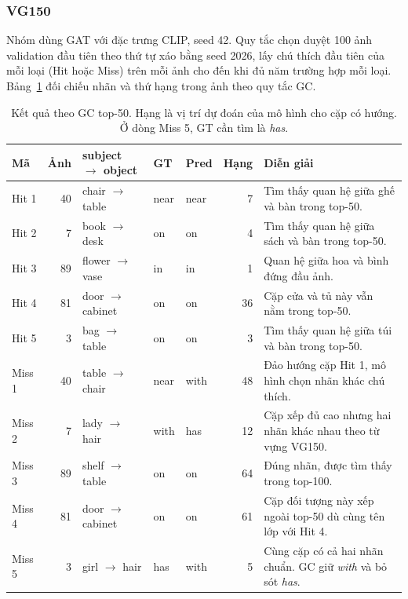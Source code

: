 \subsubsection{VG150}\label{app:vgcases}
Nhóm dùng GAT với đặc trưng CLIP, seed 42. Quy tắc chọn duyệt 100 ảnh validation
đầu tiên theo thứ tự xáo bằng seed 2026, lấy chú thích đầu tiên của mỗi loại
(Hit hoặc Miss) trên mỗi ảnh cho đến khi đủ năm trường hợp mỗi loại.
Bảng~\ref{tab:vgcases} đối chiếu nhãn và thứ hạng trong ảnh theo quy tắc GC.

\begin{table}[H]
\centering\small
\caption{Kết quả theo GC top-50. Hạng là vị trí dự đoán của mô hình cho cặp có hướng.
Ở dòng Miss 5, GT cần tìm là \textit{has}.}\label{tab:vgcases}
\begin{tabularx}{\linewidth}{@{}lrl llr X@{}}\toprule
Mã & Ảnh & subject $\to$ object & GT & Pred & Hạng & Diễn giải\\\midrule
Hit 1 & 40 & chair $\to$ table & near & near & 7 & Tìm thấy quan hệ giữa ghế và bàn trong top-50.\\
Hit 2 & 7 & book $\to$ desk & on & on & 4 & Tìm thấy quan hệ giữa sách và bàn trong top-50.\\
Hit 3 & 89 & flower $\to$ vase & in & in & 1 & Quan hệ giữa hoa và bình đứng đầu ảnh.\\
Hit 4 & 81 & door $\to$ cabinet & on & on & 36 & Cặp cửa và tủ này vẫn nằm trong top-50.\\
Hit 5 & 3 & bag $\to$ table & on & on & 3 & Tìm thấy quan hệ giữa túi và bàn trong top-50.\\\midrule
Miss 1 & 40 & table $\to$ chair & near & with & 48 & Đảo hướng cặp Hit 1, mô hình chọn nhãn khác chú thích.\\
Miss 2 & 7 & lady $\to$ hair & with & has & 12 & Cặp xếp đủ cao nhưng hai nhãn khác nhau theo từ vựng VG150.\\
Miss 3 & 89 & shelf $\to$ table & on & on & 64 & Đúng nhãn, được tìm thấy trong top-100.\\
Miss 4 & 81 & door $\to$ cabinet & on & on & 61 & Cặp đối tượng này xếp ngoài top-50 dù cùng tên lớp với Hit 4.\\
Miss 5 & 3 & girl $\to$ hair & has & with & 5 & Cùng cặp có cả hai nhãn chuẩn. GC giữ \textit{with} và bỏ sót \textit{has}.\\
\bottomrule\end{tabularx}
\par{}
\end{table}

